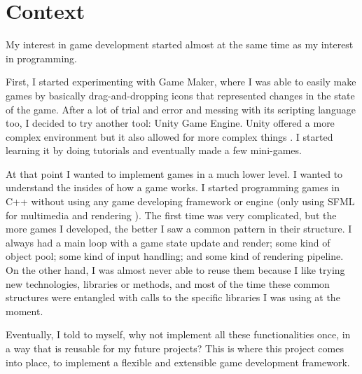 \chapter{Context}\label{ch:context}
My interest in game development started almost at the same time as my interest in 
programming.

First, I started experimenting with Game Maker\cite{GameMaker}, where I was able to easily make 
games by basically drag-and-dropping icons that represented changes in the state 
of the game. After a lot of trial and error and messing with its scripting language 
too, I decided to try another tool: Unity Game Engine.
Unity offered a more complex environment but it also allowed for more complex things
. I started learning it by doing tutorials and eventually made a few mini-games.

At that point I wanted to implement games in a much lower level. I wanted to understand 
the insides of how a game works. I started programming games in C++ without using 
any game developing framework or engine (only using SFML\cite{SFML} for multimedia and rendering
). The first time was very complicated, but the more games I developed, the better 
I saw a common pattern in their structure. I always had a main loop\cite{gameloop} with a game 
state update and render; some kind of object pool; some kind of input handling; and 
some kind of rendering pipeline. On the other hand, I was almost never able to reuse 
them because I like trying new technologies, libraries or methods, and most of the 
time these common structures were entangled with calls to the specific libraries 
I was using at the moment.

Eventually, I told to myself, why not implement all these functionalities once, in 
a way that is reusable for my future projects? This is where this project comes into 
place, to implement a flexible and extensible game development framework.
